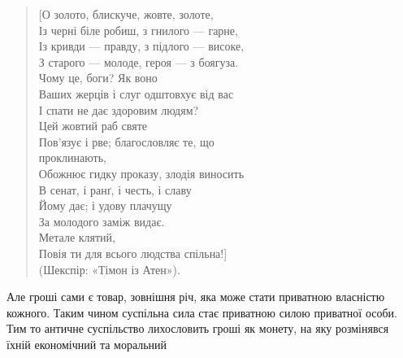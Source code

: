 {\begin{verse}
\hspace{2em}[О золото, блискуче, жовте, золоте, \\
\hspace{2em}Із черні біле робиш, з гнилого — гарне,\\
\hspace{2em}Із кривди — правду, з підлого — високе,\\
\hspace{2em}З старого — молоде, героя — з боягуза.\\
\hspace{5em}Чому це, боги? Як воно\\
\hspace{2em}Ваших жерців і слуг одштовхує від вас\\
\hspace{2em}І спати не дає здоровим людям?\\
\hspace{2em}Цей жовтий раб святе\\
\hspace{2em}Пов’язує і рве; благословляє те, що\\
\hspace{5em}проклинають,\\
\hspace{2em}Обожнює гидку проказу, злодія виносить\\
\hspace{2em}В сенат, і ранґ, і честь, і славу\\
\hspace{2em}Йому дає; і удову плачущу\\
\hspace{2em}За молодого заміж видає.\\
\hspace{2em}Метале клятий,\\
\hspace{2em}Повія ти для всього людства спільна!]\\
\hspace{4em}(Шекспір: «Тімон із Атен»).
\end{verse}
}
Але гроші сами є товар, зовнішня річ, яка може стати приватною
власністю кожного. Таким чином суспільна сила стає приватною
силою приватної особи. Тим то античне суспільство лихословить
гроші як монету, на яку розмінявся їхній економічний та моральний
